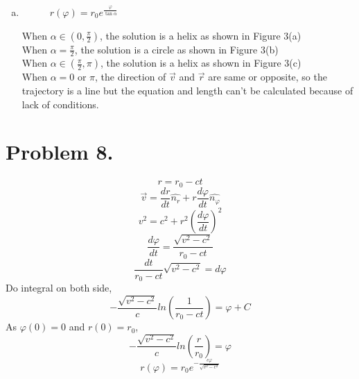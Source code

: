 \documentclass{article}
\begin{document}
\begin{enumerate}[(a)]
	\item
		\begin{figure}[h!]
			\centering				
			\caption{$r(\varphi)=r_0e^{\frac{\varphi}{\tan\alpha}}$}
			\label{fig-sample}
		\end{figure}
		
		When $\alpha\in(0,\frac{\pi}{2})$, the solution is a helix as shown in Figure 3(a)\\
		When $\alpha=\frac{\pi}{2}$, the solution is a circle as shown in Figure 3(b)\\
		When $\alpha\in(\frac{\pi}{2},\pi)$, the solution is a helix as shown in Figure 3(c)\\
		When $\alpha=0$ or $\pi$, the direction of $\vec{v}$ and $\vec{r}$ are same or opposite, so the trajectory is a line but the equation and length can't be calculated because of lack of conditions.\\
		
		
	\end{enumerate}
	
\section*{Problem 8.}
	$$r=r_0-ct$$
	$$\vec{v}=\frac{dr}{dt}\hat{n_r}+r\frac{d\varphi}{dt}\hat{n_\varphi}$$
	$$v^2=c^2+r^2\left(\frac{d\varphi}{dt}\right)^2$$
	$$\frac{d\varphi}{dt}=\frac{\sqrt{v^2-c^2}}{r_0-ct}$$
	$$\frac{dt}{r_0-ct}\sqrt{v^2-c^2}=d\varphi$$
	Do integral on both side,
	$$-\frac{\sqrt{v^2-c^2}}{c}ln\left(\frac{1}{r_0-ct}\right)=\varphi+C$$
	As $\varphi(0)=0$ and $r(0)=r_0$,
	$$-\frac{\sqrt{v^2-c^2}}{c}ln\left(\frac{r}{r_0}\right)=\varphi$$
	$$r(\varphi)=r_0e^{-\frac{c\varphi}{\sqrt{v^2-c^2}}}$$
\end{document}
